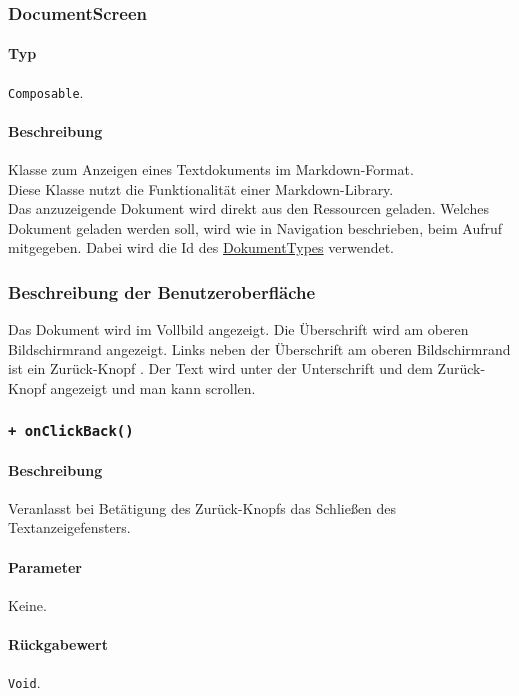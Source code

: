 \subsubsection{DocumentScreen}\label{App_DocumentViewer_DocumentScreen}
\paragraph*{Typ}
\texttt{Composable}.
\paragraph*{Beschreibung}
Klasse zum Anzeigen eines Textdokuments im Markdown-Format.\\
Diese Klasse nutzt die Funktionalität einer Markdown-Library.\\
Das anzuzeigende Dokument wird direkt aus den Ressourcen geladen.
Welches Dokument geladen werden soll, wird wie in Navigation beschrieben, beim Aufruf mitgegeben. 
Dabei wird die Id des \hyperref[App_DocumentViewer_DocumentType]{DokumentTypes} verwendet.

\subsubsection*{Beschreibung der Benutzeroberfläche}
Das Dokument wird im Vollbild angezeigt.
Die Überschrift wird am oberen Bildschirmrand angezeigt.
Links neben der Überschrift am oberen Bildschirmrand ist ein \dq Zurück-Knopf \dq{}.
Der Text wird unter der Unterschrift und dem \dq Zurück-Knopf \dq{} angezeigt und man kann scrollen.

\subsubsection*{\texttt{+ onClickBack()}}\label{App_DocumentViewer_DocumentScreen_onClickBack}%
\paragraph*{Beschreibung}
Veranlasst bei Betätigung des \dq Zurück-Knopfs \dq{} das Schließen des Textanzeigefensters.
\paragraph*{Parameter}
Keine.
\paragraph*{Rückgabewert}
\texttt{Void}.

